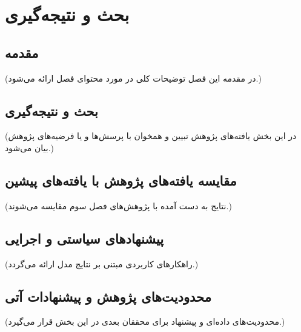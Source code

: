 \chapter{بحث و نتیجه‌گیری}

\section{مقدمه}
(در مقدمه این فصل توضیحات کلی در مورد محتوای فصل ارائه می‌شود.)

\section{بحث و نتیجه‌گیری}
(در این بخش یافته‌های پژوهش تبیین و همخوان با پرسش‌ها و یا فرضیه‌های پژوهش بیان می‌شود.)

\section{مقایسه یافته‌های پژوهش با یافته‌های پیشین}
(نتایج به دست آمده با پژوهش‌های فصل سوم مقایسه می‌شوند.)

\section{پیشنهادهای سیاستی و اجرایی}
(راهکارهای کاربردی مبتنی بر نتایج مدل ارائه می‌گردد.)

\section{محدودیت‌های پژوهش و پیشنهادات آتی}
(محدودیت‌های داده‌ای و پیشنهاد برای محققان بعدی در این بخش قرار می‌گیرد.)